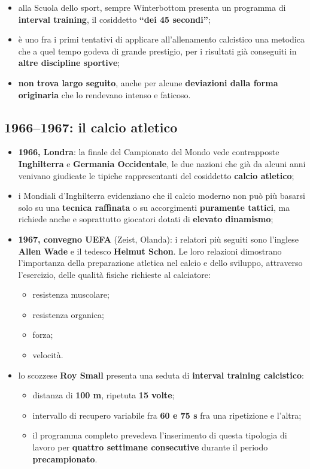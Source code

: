 \begin{itemize}
  \item alla Scuola dello sport, sempre Winterbottom presenta un programma di \textbf{interval
    training}, il cosiddetto \textbf{``dei 45 secondi''};
  \item è uno fra i primi tentativi di applicare all'allenamento calcistico una metodica che a quel
    tempo godeva di grande prestigio, per i risultati già conseguiti in \textbf{altre discipline
    sportive};
  \item \textbf{non trova largo seguito}, anche per alcune \textbf{deviazioni dalla forma
    originaria} che lo rendevano intenso e faticoso.
\end{itemize}

\subsection{1966--1967: il calcio atletico}

\begin{itemize}
  \item \textbf{1966, Londra}: la finale del Campionato del Mondo vede contrapposte
    \textbf{Inghilterra} e \textbf{Germania Occidentale}, le due nazioni che già da alcuni anni
    venivano giudicate le tipiche rappresentanti del cosiddetto \textbf{calcio atletico};
  \item i Mondiali d'Inghilterra evidenziano che il calcio moderno non può più basarsi solo su una
    \textbf{tecnica raffinata} o su accorgimenti \textbf{puramente tattici}, ma richiede anche e
    soprattutto giocatori dotati di \textbf{elevato dinamismo};
  \item \textbf{1967, convegno UEFA} (Zeist, Olanda): i relatori più seguiti sono l'inglese
    \textbf{Allen Wade} e il tedesco \textbf{Helmut Schon}. Le loro relazioni dimostrano
    l'importanza della preparazione atletica nel calcio e dello sviluppo, attraverso l'esercizio,
    delle qualità fisiche richieste al calciatore:
    \begin{itemize}
      \item resistenza muscolare;
      \item resistenza organica;
      \item forza;
      \item velocità.
    \end{itemize}
  \item lo scozzese \textbf{Roy Small} presenta una seduta di \textbf{interval training calcistico}:
    \begin{itemize}
      \item distanza di \textbf{100 m}, ripetuta \textbf{15 volte};
      \item intervallo di recupero variabile fra \textbf{60 e 75 s} fra una ripetizione e l'altra;
      \item il programma completo prevedeva l'inserimento di questa tipologia di lavoro per
        \textbf{quattro settimane consecutive} durante il periodo \textbf{precampionato}.
    \end{itemize}
\end{itemize}

